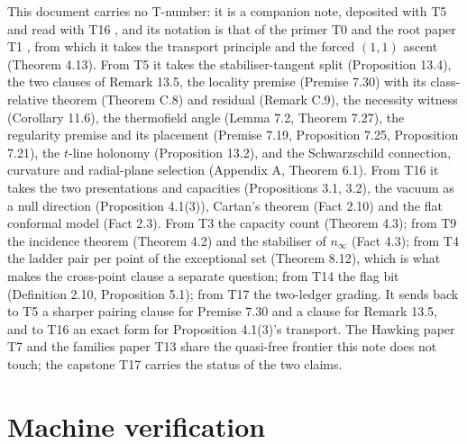\documentclass[11pt]{article}
\theoremstyle{definition}
\theoremstyle{plain}
\providecommand{\ninf}{}\renewcommand{\ninf}{n_{\infty}}
\begin{document}
\label{c:note.pairing.setting-position-series}
This document carries no T-number: it is a companion note, deposited with T5 \cite{ButlerT5} and read with T16 \cite{ButlerT16}, and its notation is that of the primer T0 \cite{ButlerT0} and the root paper T1 \cite{ButlerT1}, from which it takes the transport principle and the forced $(1,1)$ ascent (Theorem 4.13). From T5 it takes the stabiliser-tangent split (Proposition 13.4), the two clauses of Remark 13.5, the locality premise (Premise 7.30) with its class-relative theorem (Theorem C.8) and residual (Remark C.9), the necessity witness (Corollary 11.6), the thermofield angle (Lemma 7.2, Theorem 7.27), the regularity premise and its placement (Premise 7.19, Proposition 7.25, Proposition 7.21), the $t$-line holonomy (Proposition 13.2), and the Schwarzschild connection, curvature and radial-plane selection (Appendix A, Theorem 6.1). From T16 it takes the two presentations and capacities (Propositions 3.1, 3.2), the vacuum as a null direction (Proposition 4.1(3)), Cartan's theorem (Fact 2.10) and the flat conformal model (Fact 2.3). From T3 \cite{ButlerT3} the capacity count (Theorem 4.3); from T9 \cite{ButlerT9} the incidence theorem (Theorem 4.2) and the stabiliser of $\ninf$ (Fact 4.3); from T4 \cite{ButlerT4} the ladder pair per point of the exceptional set (Theorem 8.12), which is what makes the cross-point clause a separate question; from T14 \cite{ButlerT14} the flag bit (Definition 2.10, Proposition 5.1); from T17 \cite{ButlerT17} the two-ledger grading. It sends back to T5 a sharper pairing clause for Premise 7.30 and a clause for Remark 13.5, and to T16 an exact form for Proposition 4.1(3)'s transport. The Hawking paper T7 \cite{ButlerT7} and the families paper T13 \cite{ButlerT13} share the quasi-free frontier this note does not touch; the capstone T17 \cite{ButlerT17} carries the status of the two claims.

\section{Machine verification}
\end{document}
